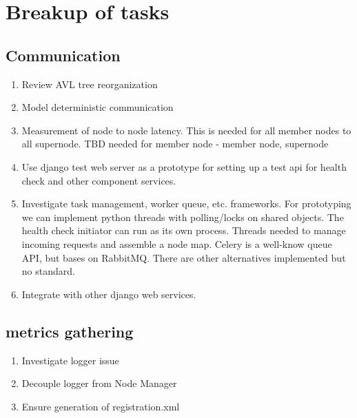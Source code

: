 \documentclass[oneside,12pt]{memoir}
\begin{document}
\section{Breakup of tasks}

\subsection{Communication}

\begin{enumerate}
\item
Review AVL tree reorganization
\item
Model deterministic communication
\item
Measurement of node to node latency.  This is needed for all member nodes to all supernode.  TBD  needed for member node - member node, supernode 
\item
Use django test web server as a prototype for setting up a test api for health check and other component services.
\item
Investigate task management, worker queue, etc.  frameworks.  For prototyping we can implement python threads with polling/locks on shared objects.  The health check initiator can run as its own process.  Threads needed to manage incoming requests and assemble a node map.  Celery is a well-know queue API, but bases on RabbitMQ.  There are other alternatives implemented but no standard.
\item
Integrate with other django web services.  


\end{enumerate}



\subsection{metrics gathering}
\begin{enumerate}
\item Investigate logger issue
\item Decouple logger from Node Manager
\item Ensure generation of registration.xml
\end{enumerate}
\end{document}
